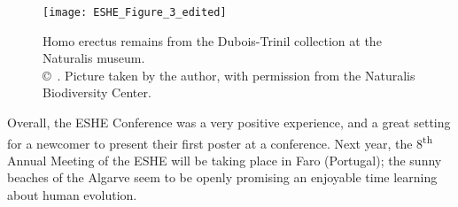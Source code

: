 \begin{figure}[!tb]
	\texttt{[image: ESHE\_Figure\_3\_edited]}
	\caption{Homo erectus remains from the Dubois-Trinil collection at the Naturalis museum.
		{\normalfont\scriptsize \\ \copyright\
			\shortauthor. Picture taken by the author, with permission from the Naturalis Biodiversity Center.
	}}
	\label{fig:ESHE_Figure_3_edited}
\end{figure}

Overall, the ESHE Conference was a very positive experience, and a great setting for a newcomer to present their first poster at a conference. Next year, the 8\textsuperscript{th} Annual Meeting of the ESHE will be taking place in Faro (Portugal); the sunny beaches of the Algarve seem to be openly promising an enjoyable time learning about human evolution.

\IJSRAclosing%
